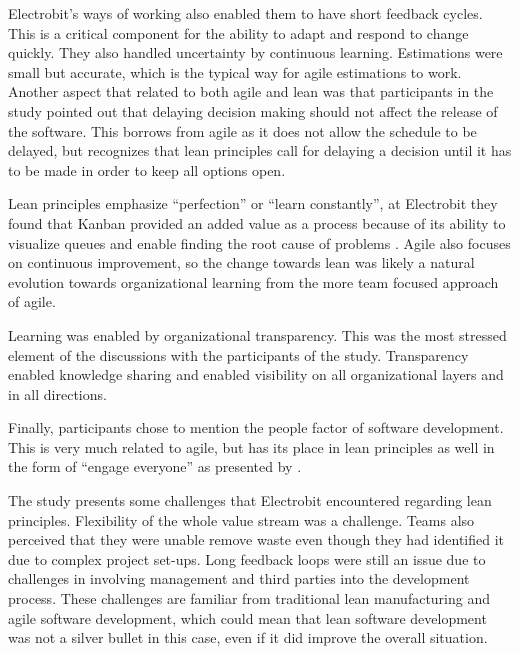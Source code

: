 Electrobit's ways of working also enabled them to have short feedback cycles. This is a critical component for the ability to adapt and respond to change quickly. They also handled uncertainty by continuous learning. Estimations were small but accurate, which is the typical way for agile estimations to work. Another aspect that related to both agile and lean was that participants in the study pointed out that delaying decision making should not affect the release of the software.\cite{Rodriguez2014Combining} This borrows from agile as it does not allow the schedule to be delayed, but recognizes that lean principles call for delaying a decision until it has to be made in order to keep all options open.

Lean principles emphasize ``perfection'' or ``learn constantly'', at Electrobit they found that Kanban provided an added value as a process because of its ability to visualize queues and enable finding the root cause of problems \cite{Rodriguez2014Combining}. Agile also focuses on continuous improvement, so the change towards lean was  likely a natural evolution towards organizational learning from the more team focused approach of agile.

Learning was enabled by organizational transparency. This was the most stressed element of the discussions with the participants of the study. Transparency enabled knowledge sharing and enabled visibility on all organizational layers and in all directions. \cite{Rodriguez2014Combining}

Finally, participants chose to mention the people factor of software development. This is very much related to agile, but has its place in lean principles as well in the form of ``engage everyone'' as presented by \cite{poppendieck2003lean}.

The study presents some challenges that Electrobit encountered regarding lean principles. Flexibility of the whole value stream was a challenge. Teams also perceived that they were unable remove waste even though they had identified it due to complex project set-ups. Long feedback loops were still an issue due to challenges in involving management and third parties into the development process. \cite{Rodriguez2014Combining} These challenges are familiar from traditional lean manufacturing and agile software development, which could mean that lean software development was not a silver bullet in this case, even if it did improve the overall situation.


